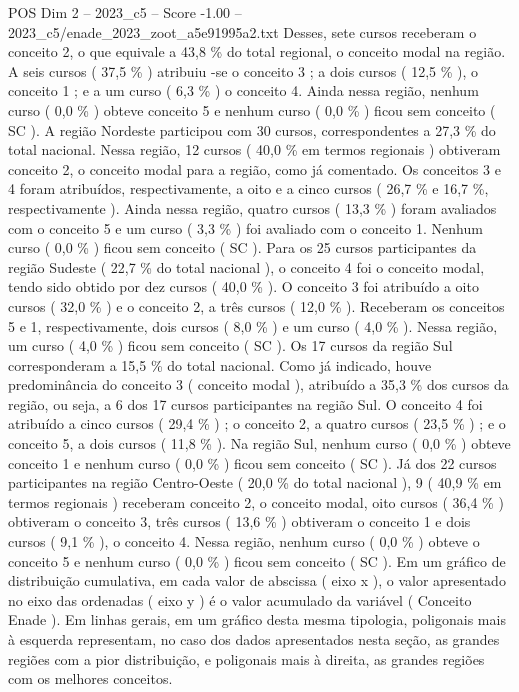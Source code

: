 \begin{textsample}{POS Dim 2 – 2023\_c5 – Score -1.00 – 2023\_c5/enade\_2023\_zoot\_a5e91995a2.txt}
Desses, sete cursos receberam o conceito 2, o que equivale a 43,8 \% do total regional, o conceito modal na região.
A seis cursos ( 37,5 \% ) atribuiu -se o conceito 3 ; a dois cursos ( 12,5 \% ), o conceito 1 ; e a um curso ( 6,3 \% ) o conceito 4.
Ainda nessa região, nenhum curso ( 0,0 \% ) obteve conceito 5 e nenhum curso ( 0,0 \% ) ficou sem conceito ( SC ).
A região Nordeste participou com 30 cursos, correspondentes a 27,3 \% do total nacional.
Nessa região, 12 cursos ( 40,0 \% em termos regionais ) obtiveram conceito 2, o conceito modal para a região, como já comentado.
Os conceitos 3 e 4 foram atribuídos, respectivamente, a oito e a cinco cursos ( 26,7 \% e 16,7 \%, respectivamente ).
Ainda nessa região, quatro cursos ( 13,3 \% ) foram avaliados com o conceito 5 e um curso ( 3,3 \% ) foi avaliado com o conceito 1.
Nenhum curso ( 0,0 \% ) ficou sem conceito ( SC ).
Para os 25 cursos participantes da região Sudeste ( 22,7 \% do total nacional ), o conceito 4 foi o conceito modal, tendo sido obtido por dez cursos ( 40,0 \% ).
O conceito 3 foi atribuído a oito cursos ( 32,0 \% ) e o conceito 2, a três cursos ( 12,0 \% ).
Receberam os conceitos 5 e 1, respectivamente, dois cursos ( 8,0 \% ) e um curso ( 4,0 \% ).
Nessa região, um curso ( 4,0 \% ) ficou sem conceito ( SC ).
Os 17 cursos da região Sul corresponderam a 15,5 \% do total nacional.
Como já indicado, houve predominância do conceito 3 ( conceito modal ), atribuído a 35,3 \% dos cursos da região, ou seja, a 6 dos 17 cursos participantes na região Sul.
O conceito 4 foi atribuído a cinco cursos ( 29,4 \% ) ; o conceito 2, a quatro cursos ( 23,5 \% ) ; e o conceito 5, a dois cursos ( 11,8 \% ).
Na região Sul, nenhum curso ( 0,0 \% ) obteve conceito 1 e nenhum curso ( 0,0 \% ) ficou sem conceito ( SC ).
Já dos 22 cursos participantes na região Centro-Oeste ( 20,0 \% do total nacional ), 9 ( 40,9 \% em termos regionais ) receberam conceito 2, o conceito modal, oito cursos ( 36,4 \% ) obtiveram o conceito 3, três cursos ( 13,6 \% ) obtiveram o conceito 1 e dois cursos ( 9,1 \% ), o conceito 4.
Nessa região, nenhum curso ( 0,0 \% ) obteve o conceito 5 e nenhum curso ( 0,0 \% ) ficou sem conceito ( SC ).
Em um gráfico de distribuição cumulativa, em cada valor de abscissa ( eixo x ), o valor apresentado no eixo das ordenadas ( eixo y ) é o valor acumulado da variável ( Conceito Enade ).
Em linhas gerais, em um gráfico desta mesma tipologia, poligonais mais à esquerda representam, no caso dos dados apresentados nesta seção, as grandes regiões com a pior distribuição, e poligonais mais à direita, as grandes regiões com os melhores conceitos.

\end{textsample}
